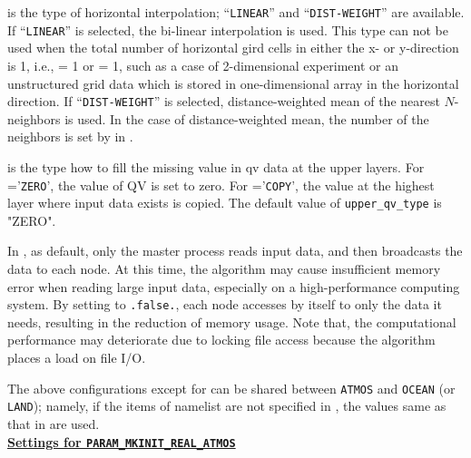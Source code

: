  is the type of horizontal interpolation;
``\verb|LINEAR|'' and ``\verb|DIST-WEIGHT|'' are available.
If ``\verb|LINEAR|'' is selected, the bi-linear interpolation is used.
This type can not be used when the total number of horizontal gird cells in either the x- or y-direction is 1, i.e.,  = 1 or  = 1, such as a case of 2-dimensional experiment or an unstructured grid data which is stored in one-dimensional array in the horizontal direction.
If ``\verb|DIST-WEIGHT|'' is selected, distance-weighted mean of the nearest $N$-neighbors is used.
In the case of distance-weighted mean, the number of the neighbors is set by  in .

 is the type how to fill the missing value in qv data at the upper layers.
For ='\verb|ZERO|', the value of QV is set to zero.
For ='\verb|COPY|', the value at the highest layer where input data exists is copied.
The default value of \verb|upper_qv_type| is "ZERO".


In \scalerm, as default, only the master process reads input data, and then broadcasts the data to each node.
At this time, the algorithm may cause insufficient memory error when reading large input data, especially on a high-performance computing system.
By setting  to \verb|.false.|, each node accesses by itself to only the data it needs, resulting in the reduction of memory usage.
Note that, the computational performance may deteriorate due to locking file access because the algorithm places a load on file I/O.


The above configurations except for  can be shared between \verb|ATMOS| and \verb|OCEAN| (or \verb|LAND|);
namely, if the items of namelist are not specified in ,
the values same as that in  are used.
\\

\noindent\textbf{\underline{Settings for \texttt{PARAM\_MKINIT\_REAL\_ATMOS}}}

